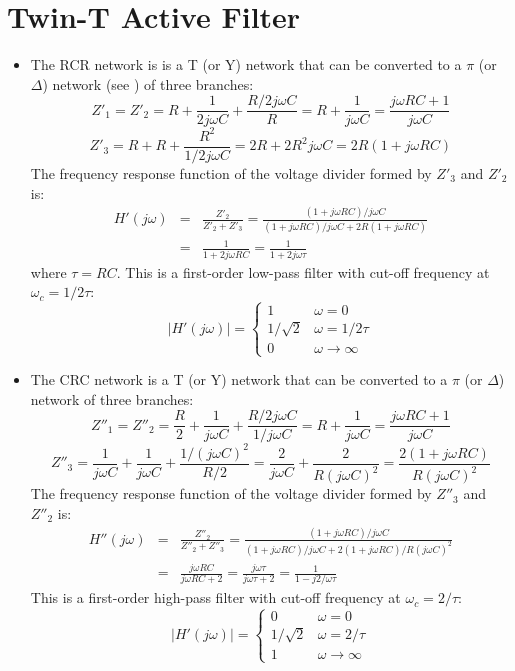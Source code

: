 \usepackage{html}


\section*{Twin-T Active Filter}


\begin{itemize}
\item The RCR network is is a T (or Y) network that can be converted to a 
  $\pi$ (or $\Delta$) network (see 
  ) 
  of three branches:
  \[
  Z'_1=Z'_2=R+\frac{1}{2j\omega C}+\frac{R/2j\omega C}{R}
  =R+\frac{1}{j\omega C}=\frac{j\omega RC+1}{j\omega C}
  \]
  \[
  Z'_3=R+R+\frac{R^2}{1/2j\omega C}=2R+2R^2j\omega C=2R(1+j\omega RC)
  \]
  The frequency response function of the voltage divider formed by 
  $Z'_3$ and $Z'_2$ is:
  \begin{eqnarray}
  H'(j\omega)&=&\frac{Z'_2}{Z'_2+Z'_3}
  =\frac{(1+j\omega RC)/j\omega C}{(1+j\omega RC)/j\omega C+2R(1+j\omega RC)}
  \nonumber\\
  &=&\frac{1}{1+2j\omega RC}=\frac{1}{1+2j\omega\tau}
  \nonumber
  \end{eqnarray}
  where $\tau=RC$. This is a first-order low-pass filter with cut-off
  frequency at $\omega_c=1/2\tau$:
  \[
  |H'(j\omega)|=\left\{\begin{array}{ll}1 & \omega=0\\1/\sqrt{2}& 
  \omega=1/2\tau\\ 0&\omega\rightarrow\infty\end{array}\right.
  \]

\item The CRC network is a T (or Y) network that can be converted to a
  $\pi$ (or $\Delta$) network of three branches:
  \[
  Z''_1=Z''_2=\frac{R}{2}+\frac{1}{j\omega C}+\frac{R/2j\omega C}{1/j\omega C}
  =R+\frac{1}{j\omega C}  =\frac{j\omega RC+1}{j\omega C}
  \]
  \[
  Z''_3=\frac{1}{j\omega C}+\frac{1}{j\omega C}+\frac{1/(j\omega C)^2}{R/2}
  =\frac{2}{j\omega C}+\frac{2}{R(j\omega C)^2}
  =\frac{2(1+j\omega RC)}{R(j\omega C)^2}
  \]
  The frequency response function of the voltage divider formed by $Z''_3$ 
  and $Z''_2$ is:
  \begin{eqnarray}
  H''(j\omega)&=&\frac{Z''_2}{Z''_2+Z''_3}
  =\frac{(1+j\omega RC)/j\omega C}
  {(1+j\omega RC)/j\omega C+2(1+j\omega RC)/R(j\omega C)^2}
  \nonumber \\
  &=&\frac{j\omega RC}{j\omega RC+2}=\frac{j\omega\tau}{j\omega\tau+2}
  =\frac{1}{1-j2/\omega\tau}
  \nonumber 
  \end{eqnarray}
  This is a first-order high-pass filter with cut-off frequency at
  $\omega_c=2/\tau$:
  \[
  |H'(j\omega)|=\left\{\begin{array}{ll}0 & \omega=0\\1/\sqrt{2}& 
  \omega=2/\tau\\ 1&\omega\rightarrow\infty\end{array}\right.
  \]

\end{itemize}

